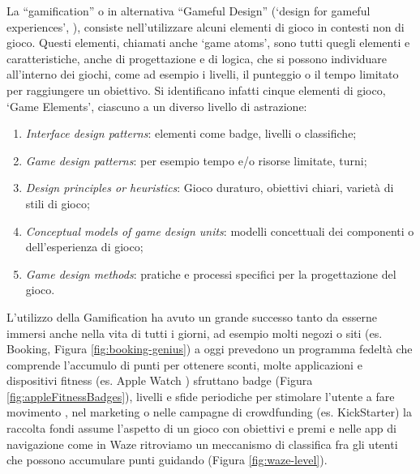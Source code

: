 La \enquote{gamification} o in alternativa \enquote{Gameful Design} (\enquote*{design for gameful experiences}, \cite{definingGamification2011}), consiste nell'utilizzare alcuni elementi di gioco in contesti non di gioco. Questi elementi, chiamati anche \enquote*{game atoms}, sono tutti quegli elementi e caratteristiche, anche di progettazione e di logica, che si possono individuare all'interno dei giochi, come ad esempio i livelli, il punteggio o il tempo limitato per raggiungere un obiettivo.
Si identificano infatti cinque elementi di gioco, \enquote*{Game Elements}, ciascuno a un diverso livello di astrazione: 

\begin{enumerate}
    \item \emph{Interface design patterns}: elementi come badge, livelli o classifiche;
    \item \emph{Game design patterns}: per esempio tempo e/o risorse limitate, turni;
    \item \emph{Design principles or heuristics}: Gioco duraturo, obiettivi chiari, varietà di stili di gioco;
    \item \emph{Conceptual models of game design units}: modelli concettuali dei componenti o dell'esperienza di gioco;
    \item \emph{Game design methods}: pratiche e processi specifici per la progettazione del gioco.
\end{enumerate}

L'utilizzo della Gamification ha avuto un grande successo tanto da esserne immersi anche nella vita di tutti i giorni, ad esempio molti negozi o siti (es. Booking, Figura \ref{fig:booking-genius}) a oggi prevedono un programma fedeltà che comprende l'accumulo di punti per ottenere sconti, molte applicazioni e dispositivi fitness (es. Apple Watch \cite{appleWatchGamification}) sfruttano badge (Figura \ref{fig:appleFitnessBadges}), livelli e sfide periodiche per stimolare l'utente a fare movimento \cite{gamification4exercise}, nel marketing o nelle campagne di crowdfunding (es. KickStarter) la raccolta fondi assume l'aspetto di un gioco con obiettivi e premi e nelle app di navigazione come in Waze ritroviamo un meccanismo di classifica fra gli utenti che possono accumulare punti guidando (Figura \ref{fig:waze-level}).

